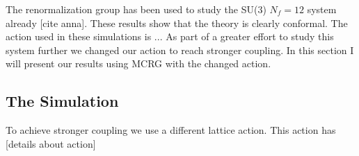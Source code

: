 
The renormalization group has been used to study the SU(3) $N_f = 12$ system already [cite anna].
These results show that the theory is clearly conformal.
The action used in these simulations is ...
As part of a greater effort to study this system further we changed our action to reach stronger coupling.
In this section I will present our results using MCRG with the changed action.

\subsection{The Simulation}
To achieve stronger coupling we use a different lattice action.  
This action has [details about action]




